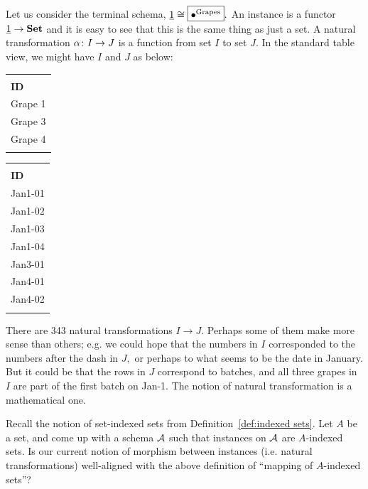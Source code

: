 \documentclass[../main/CT4S-EN-RU]{subfiles}
\begin{document}
\begin{blockRUS}
\end{blockRUS}

\begin{exampleENG}\label{ex:nts on term}
Let us consider the terminal schema, $\underline{1}\cong\fbox{$\bullet^{\textnormal{Grapes}}$}.$ An instance is a functor $\underline{1}\rightarrow{\mathbf{Set}}$ and it is easy to see that this is the same thing as just a set. A natural transformation $\alpha\colon I\rightarrow J$ is a function from set $I$ to set $J.$ In the standard table view, we might have $I$ and $J$ as below:
\begin{center}
\begin{tabular}{| l ||}\bhline
\multicolumn{1}{| c |}{Grapes $(I)$}\\\bhline
{\bf ID}\\\bbhline
Grape 1\\\hline
Grape 3\\\hline
Grape 4\\\bhline
\end{tabular}
\hspace{1in}
\begin{tabular}{| l ||}\bhline
\multicolumn{1}{| c |}{Grapes $(J)$}\\\bhline
{\bf ID}\\\bbhline
Jan1-01\\\hline
Jan1-02\\\hline
Jan1-03\\\hline
Jan1-04\\\hline
Jan3-01\\\hline
Jan4-01\\\hline
Jan4-02\\\bhline
\end{tabular}
\end{center}

There are 343 natural transformations $I\to J.$ Perhaps some of them make more sense than others; e.g. we could hope that the numbers in $I$ corresponded to the numbers after the dash in $J,$ or perhaps to what seems to be the date in January. But it could be that the rows in $J$ correspond to batches, and all three grapes in $I$ are part of the first batch on Jan-1. The notion of natural transformation is a mathematical one.
\end{exampleENG}

\begin{exampleRUS}\label{ex:nts on term}
\end{exampleRUS}

\begin{exerciseENG}\label{exc:indexed sets as functors}
Recall the notion of set-indexed sets from Definition~\ref{def:indexed sets}. Let $A$ be a set, and come up with a schema $\mathcal{A}$ such that instances on $\mathcal{A}$ are $A$-indexed sets. Is our current notion of morphism between instances (i.e. natural transformations) well-aligned with the above definition of “mapping of $A$-indexed sets”?
\end{exerciseENG}
\end{document}
